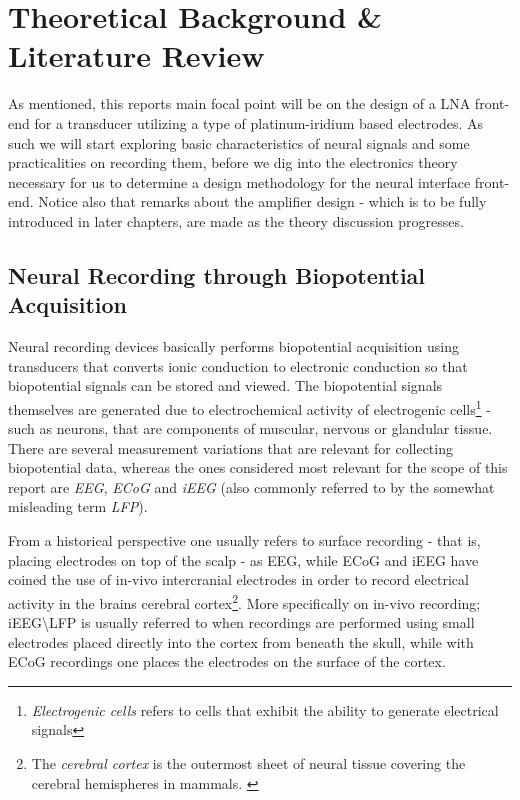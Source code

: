 \chapter{Theoretical Background \& Literature Review}
\label{chap:two}
 
 As mentioned, this reports main focal point will be on the design of a \acs{LNA} front-end for a transducer utilizing a type of platinum-iridium based electrodes. 
 As such we will start exploring basic characteristics of neural signals and some practicalities on recording them, before we dig into the electronics theory necessary for us to determine a design methodology for the neural interface front-end. Notice also that remarks about the amplifier design - which is to be fully introduced in later chapters, are made as the theory discussion progresses.
 
  \section{Neural Recording through Biopotential Acquisition}
  \label{sec:biopotential-aquisition}
  Neural recording devices basically performs biopotential acquisition using transducers that converts ionic conduction to electronic conduction so that biopotential 
  signals can be stored and viewed. The biopotential signals themselves are generated due to electrochemical activity of electrogenic cells\footnote{\emph{Electrogenic cells} 
  refers to cells that exhibit the ability to generate electrical signals\cite{GBM8320-2013-electrodes-ch8-pt1}} - such as neurons, that are components of muscular, 
  nervous or glandular tissue. There are several measurement variations that are relevant for collecting biopotential data, whereas the ones considered most relevant 
  for the scope of this report are \emph{\acf{EEG}}, \emph{\acf{ECoG}} and \emph{\acf{iEEG}} (also commonly referred to by the somewhat misleading term \emph{\acf{LFP}}).
  
    From a historical perspective one usually refers to surface recording - that is, placing electrodes on top of the scalp - as \acs{EEG}, while \acs{ECoG} and \acs{iEEG} have coined the use of in-vivo
  intercranial electrodes in order to record electrical activity in the brains cerebral cortex\footnote{The \emph{cerebral cortex} is the outermost sheet of neural tissue covering the cerebral hemispheres in mammals. \cite{marcus2014future}}.
	More specifically on in-vivo recording; \acs{iEEG}\textbackslash\acs{LFP} is usually referred to when recordings are performed using small electrodes placed directly into the cortex from beneath the skull,
  while with \acs{ECoG} recordings one places the electrodes on the surface of the cortex.%
  
